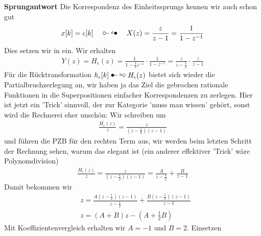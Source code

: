 \begin{ExCalc}
\textbf{Sprungantwort}
Die Korrespondenz des Einheitssprungs kennen wir auch schon gut
\begin{align}
x[k]=\epsilon[k] \quad\ztransf\quad X(z) = \frac{z}{z-1} = \frac{1}{1-z^{-1}}
\end{align}
Dies setzen wir in  ein. Wir erhalten
\begin{align}
Y(z) = H_\epsilon(z) = \frac{1}{1-\frac{1}{2} z^{-1}} \cdot \frac{1}{1-z^{-1}} =
\frac{z}{z-\frac{1}{2}} \cdot \frac{z}{z-1}
\end{align}
Für die Rücktransformation $h_\epsilon[k] \Ztransf H_\epsilon(z)$ bietet sich
wieder die Partialbruchzerlegung an, wir haben ja das Ziel die gebrochen rationale
Funktionen in die Superpositionen einfacher Korrespondenzen zu zerlegen.
Hier ist jetzt ein 'Trick' sinnvoll, der zur Kategorie 'muss man wissen' gehört,
sonst wird die Rechnerei eher unschön:
Wir schreiben um
\begin{align}
\frac{H_\epsilon(z)}{z} = \frac{z}{(z-\frac{1}{2})(z-1)}
\end{align}
und führen die PZB für den rechten Term aus, wir werden beim letzten Schritt der
Rechnung sehen, warum das elegant ist (ein anderer effektiver 'Trick' wäre
Polynomdivision)
\begin{align}
\frac{H_\epsilon(z)}{z} = \frac{z}{(z-\frac{1}{2})(z-1)} = \frac{A}{z-\frac{1}{2}} + \frac{B}{z-1}
\end{align}
Damit bekommen wir
\begin{align}
&z = \frac{A(z-\frac{1}{2})(z-1)}{z-\frac{1}{2}} + \frac{B (z-\frac{1}{2})(z-1)}{z-1}\\
&z = (A+B) z - (A + \frac{1}{2}B)
\end{align}
Mit Koeffizientenvergleich erhalten wir $A = -1$ und $B=2$.
Einsetzen
\begin{align}

\end{align}
\end{ExCalc}
